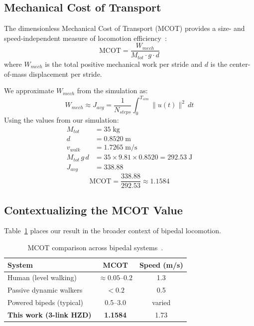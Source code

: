 \documentclass[conference]{IEEEtran}
\begin{document}
\subsection{Mechanical Cost of Transport}

The dimensionless Mechanical Cost of Transport (MCOT) provides a size- and speed-independent measure of locomotion efficiency~\cite{ambrose2017}:
\begin{equation}
    \text{MCOT} = \frac{W_{mech}}{M_{tot}\cdot g \cdot d} \label{eq:mcot}
\end{equation}
where $W_{mech}$ is the total positive mechanical work per stride and $d$ is the center-of-mass displacement per stride.

We approximate $W_{mech}$ from the simulation as:
\begin{equation}
    W_{mech} \approx J_{avg} = \frac{1}{N_{steps}} \int_0^{T_{sim}} \|u(t)\|^2\, dt
\end{equation}
Using the values from our simulation:
\begin{align*}
    M_{tot}           &= 35\;\text{kg} \\
    d                 &= 0.8520\;\text{m} \\
    v_{walk}          &= 1.7265\;\text{m/s} \\
    M_{tot}\,g\,d &= 35 \times 9.81 \times 0.8520 = 292.53\;\text{J} \\
    J_{avg}           &= 338.88
\end{align*}
\begin{equation}
    \boxed{\text{MCOT} = \frac{338.88}{292.53} \approx 1.1584}
\end{equation}

\subsection{Contextualizing the MCOT Value}

Table~\ref{tab:mcot_compare} places our result in the broader context of bipedal locomotion.

\begin{table}[htbp]
    \centering
    \caption{MCOT comparison across bipedal systems~\cite{ambrose2017}.}
    \label{tab:mcot_compare}
    \begin{tabular}{lcc}
        \toprule
        \textbf{System}            & \textbf{MCOT} & \textbf{Speed (m/s)} \\
        \midrule
        Human (level walking)      & $\approx 0.05$--$0.2$ & 1.3 \\
        Passive dynamic walkers    & $< 0.2$               & 0.5 \\
        Powered bipeds (typical)   & 0.5--3.0              & varied \\
        \textbf{This work (3-link HZD)} & \textbf{1.1584} & 1.73 \\
        \bottomrule
    \end{tabular}
\end{table}
\end{document}

